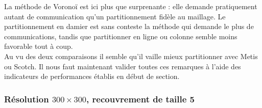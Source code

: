 \documentclass[a4paper,11pt]{article}
\begin{document}
\noindent La méthode de Voronoï est ici plus que surprenante : elle demande pratiquement autant de communication qu'un partitionnement fidèle au maillage. Le partitionnement en damier est sans conteste la méthode qui demande le plus de communications, tandis que partitionner en ligne ou colonne semble moins favorable tout à coup. \\
Au vu des deux comparaisons il semble qu'il vaille mieux partitionner avec Metis ou Scotch. Il nous faut maintenant valider toutes ces remarques à l'aide des indicateurs de performances établis en début de section.
\vspace{-9mm}
\subsubsection{Résolution $300\times 300$, recouvrement de taille 5}
\vspace{-7mm}
\end{document}
